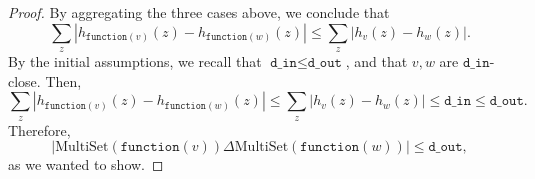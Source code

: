 \documentclass[11pt,a4paper]{article}
\theoremstyle{definition}
\newcommand{\MultiSet}{\mathrm{MultiSet}}
\newcommand{\din}{\texttt{d\_in}}
\newcommand{\dout}{\texttt{d\_out}}
\newcommand{\function}{\texttt{function}}
\newcommand{\silvia}[1]{{ {\color{blue}{(silvia)~#1}}}}
\newcommand{\grace}[1]{{ {\color{purple}{(grace)~#1}}}}
\begin{document}
\begin{proof}

By aggregating the three cases above, we conclude that
\[
\sum_z |h_{\function(v)}(z) - h_{\function(w)}(z)| \leq \sum_z |h_v(z) - h_w(z)|.
\]
By the initial assumptions, we recall that $\din \leq \dout$, and that $v, w$ are $\din$-close. Then,
\[
\sum_z |h_{\function(v)}(z) - h_{\function(w)}(z)| \leq \sum_z |h_v(z) - h_w(z)| \leq \din \leq \dout.
\]
Therefore, 
\[
|\MultiSet(\function(v)) \Delta \MultiSet(\function(w))| \leq \dout,
\]
as we wanted to show.
\end{proof}

\silvia{Maybe add domain of $z$ below the sum?}


\end{document}
